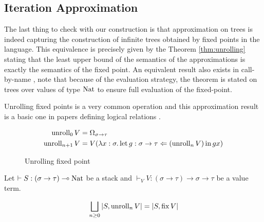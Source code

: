 \subsection{Iteration Approximation}

The last thing to check with our construction is that approximation on trees 
is indeed capturing the construction of infinite trees obtained by fixed points 
in the language. This equivalence 
is precisely given by the Theorem \ref{thm:unrolling} stating that 
the least upper bound of the semantics of the approximations is 
exactly the semantics of the fixed point. An equivalent
result also exists in call-by-name \cite{gom}, note that 
because of the evaluation strategy, the theorem is stated 
on trees over values of type $\Nat$ to ensure full 
evaluation of the fixed-point.

Unrolling fixed points is a very common operation \cite{plotkin2001adequacy}
and this approximation result is a basic one in papers defining logical 
relations \cite{pitts1997operationally} \cite{Pitts2000}.

\begin{figure}[h]
    \begin{align*}
        \Unroll_0 V     &= \Omega_{\sigma \to \tau} \\
        \Unroll_{n+1} V &= 
        V (\lambda x : \sigma. \Bind{(\Unroll_n V)}{g : \sigma \to \tau}{gx})
    \end{align*}
    \caption{Unrolling fixed point}
    \label{fig:unrolling}
\end{figure}

\begin{theorem}[Unrolling]
    \label{thm:unrolling}
    Let $\vdash S : (\sigma \to \tau) \multimap \Nat$ be a stack and 
    $\vdash_V V : (\sigma \to \tau) \to \sigma \to \tau$ be a 
    value term.

    \begin{equation*}
        \bigsqcup_{n \geq 0} |S, \Unroll_n V| = |S, \Fix V| 
    \end{equation*}
\end{theorem}

